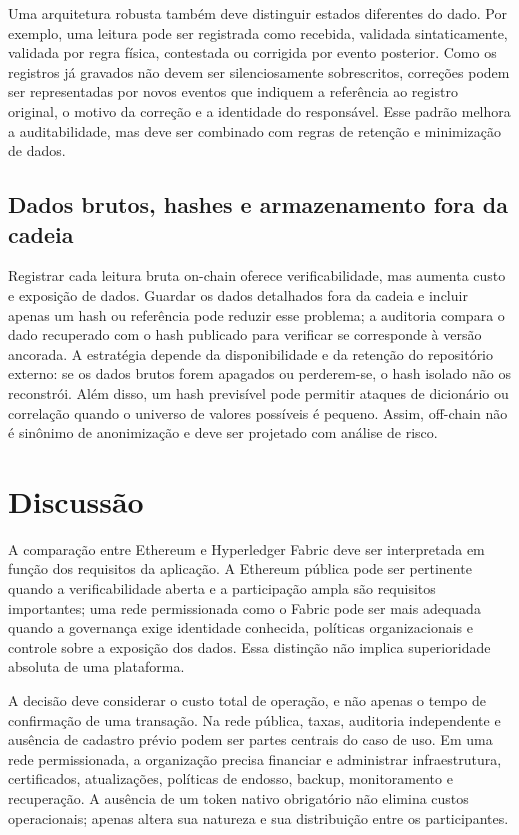 \documentclass[10pt,a4paper,twocolumn]{article}
\begin{document}
Uma arquitetura robusta também deve distinguir estados diferentes do dado. Por exemplo, uma leitura pode ser registrada como recebida, validada sintaticamente, validada por regra física, contestada ou corrigida por evento posterior. Como os registros já gravados não devem ser silenciosamente sobrescritos, correções podem ser representadas por novos eventos que indiquem a referência ao registro original, o motivo da correção e a identidade do responsável. Esse padrão melhora a auditabilidade, mas deve ser combinado com regras de retenção e minimização de dados.

\subsection{Dados brutos, hashes e armazenamento fora da cadeia}
Registrar cada leitura bruta on-chain oferece verificabilidade, mas aumenta custo e exposição de dados. Guardar os dados detalhados fora da cadeia e incluir apenas um hash ou referência pode reduzir esse problema; a auditoria compara o dado recuperado com o hash publicado para verificar se corresponde à versão ancorada. A estratégia depende da disponibilidade e da retenção do repositório externo: se os dados brutos forem apagados ou perderem-se, o hash isolado não os reconstrói. Além disso, um hash previsível pode permitir ataques de dicionário ou correlação quando o universo de valores possíveis é pequeno. Assim, off-chain não é sinônimo de anonimização e deve ser projetado com análise de risco.

\section{Discussão}
A comparação entre Ethereum e Hyperledger Fabric deve ser interpretada em função dos requisitos da aplicação. A Ethereum pública pode ser pertinente quando a verificabilidade aberta e a participação ampla são requisitos importantes; uma rede permissionada como o Fabric pode ser mais adequada quando a governança exige identidade conhecida, políticas organizacionais e controle sobre a exposição dos dados. Essa distinção não implica superioridade absoluta de uma plataforma.


A decisão deve considerar o custo total de operação, e não apenas o tempo de confirmação de uma transação. Na rede pública, taxas, auditoria independente e ausência de cadastro prévio podem ser partes centrais do caso de uso. Em uma rede permissionada, a organização precisa financiar e administrar infraestrutura, certificados, atualizações, políticas de endosso, backup, monitoramento e recuperação. A ausência de um token nativo obrigatório não elimina custos operacionais; apenas altera sua natureza e sua distribuição entre os participantes.
\end{document}
